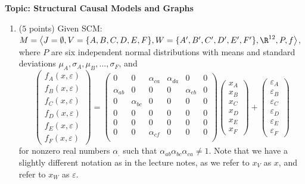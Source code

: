 
\flushleft\textbf{Topic: Structural Causal Models and Graphs}

\begin{enumerate}
\item ($5$ points) Given SCM: $M = \left\langle J=\emptyset, V=\{A, B, C, D, E, F\}, W=\{A', B', C', D', E', F'\}, \R^{12}, P, f \right\rangle$, where $P$ are six independent normal distributions with means and standard deviations $\mu_A, \sigma_A, \mu_B, ..., \sigma_F$, and
\[
	\begin{pmatrix}
		f_A(x, \varepsilon) \\ f_B(x, \varepsilon) \\ f_C(x, \varepsilon) \\ f_D(x, \varepsilon) \\ f_E(x, \varepsilon) \\ f_F(x, \varepsilon)
	\end{pmatrix}
	= 
	\begin{pmatrix}
		0 & 0 & \alpha_{ca} & \alpha_{da} & 0 & 0 \\
		\alpha_{ab} & 0 & 0 & 0 & \alpha_{eb} & 0 \\
		0 & \alpha_{bc} & 0 & 0 & 0 & 0 \\
		0 & 0 & 0 & 0 & 0 & 0 \\
		0 & 0 & 0 & 0 & 0 & 0 \\
		0 & 0 & \alpha_{cf} & 0 & 0 & 0 \\
	\end{pmatrix}
	\begin{pmatrix}
		x_A \\ x_B \\ x_C \\ x_D \\ x_E \\ x_F
	\end{pmatrix}
	+
	\begin{pmatrix}
		\varepsilon_A \\ \varepsilon_B \\ \varepsilon_C \\ \varepsilon_D \\ \varepsilon_E \\ \varepsilon_F
	\end{pmatrix}
\]
for nonzero real numbers $\alpha_.$ such that $\alpha_{ab}\alpha_{bc}\alpha_{ca} \neq 1$. Note that we have a slightly different notation as in the lecture notes, as we refer to $x_V$ as $x$, and refer to $x_W$ as $\varepsilon$.

\end{enumerate}
